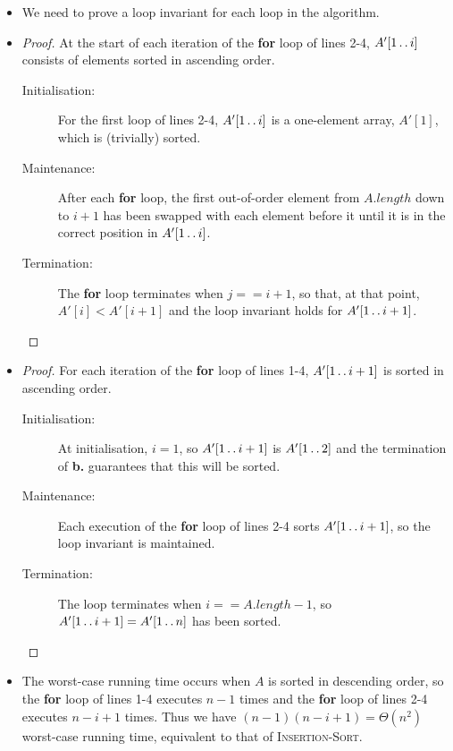 \begin{itemize}
  \item[\textbf{a.}] We need to prove a loop invariant for each loop
    in the algorithm.
  \item[\textbf{b.}]
    \begin{proof}
      At the start of each iteration of the \textbf{for} loop of lines 2-4,
      $A'[1\mathinner{{\ldotp}\,{\ldotp}} i]$ consists of elements sorted in ascending order.
      \begin{description}
        \item[Initialisation:] For the first loop of lines 2-4, $A'[1
          \mathinner{{\ldotp}\,{\ldotp}} i]$
          is a one-element array, $A'[1]$, which is (trivially) sorted.
        \item[Maintenance:] After each \textbf{for} loop, the first out-of-order
          element from $A.\mathit{length}$ down to $i + 1$ has been swapped with
          each element before it until it is in the correct position in
          $A'[1 \mathinner{{\ldotp}\,{\ldotp}} i]$.
        \item[Termination:] The \textbf{for} loop terminates when $j == i + 1$,
          so that, at that point, $A'[i] < A'[i + 1]$ and the loop invariant
          holds for $A'[1 \mathinner{{\ldotp}\,{\ldotp}} i + 1]$.
      \end{description}
    \end{proof}
  \item[\textbf{c.}]
    \begin{proof}
      For each iteration of the \textbf{for} loop of lines 1-4, $A'[1
      \mathinner{{\ldotp}\,{\ldotp}} i + 1]$
      is sorted in ascending order.
      \begin{description}
        \item[Initialisation:] At initialisation, $i = 1$, so $A'[1
          \mathinner{{\ldotp}\,{\ldotp}} i + 1]$
          is $A'[1 \mathinner{{\ldotp}\,{\ldotp}} 2]$ and the termination of \textbf{b.} guarantees
          that this will be sorted.
        \item[Maintenance:] Each execution of the \textbf{for} loop of lines 2-4
          sorts $A'[1 \mathinner{{\ldotp}\,{\ldotp}} i + 1]$, so the loop invariant is maintained.
        \item[Termination:] The loop terminates when $i ==
          A.\mathit{length} - 1$,
          so $A'[1 \mathinner{{\ldotp}\,{\ldotp}} i + 1] = A'[1 \mathinner{{\ldotp}\,{\ldotp}} n]$ has been sorted.
      \end{description}
    \end{proof}
  \item[\textbf{d.}] The worst-case running time occurs when $A$ is
    sorted in descending
    order, so the \textbf{for} loop of lines 1-4 executes $n - 1$
    times and the \textbf{for}
    loop of lines 2-4 executes $n - i + 1$ times. Thus we have
    $(n - 1)(n - i + 1) = \Theta(n^2)$ worst-case running time,
    equivalent to that of
    \textsc{Insertion-Sort}.
\end{itemize}


